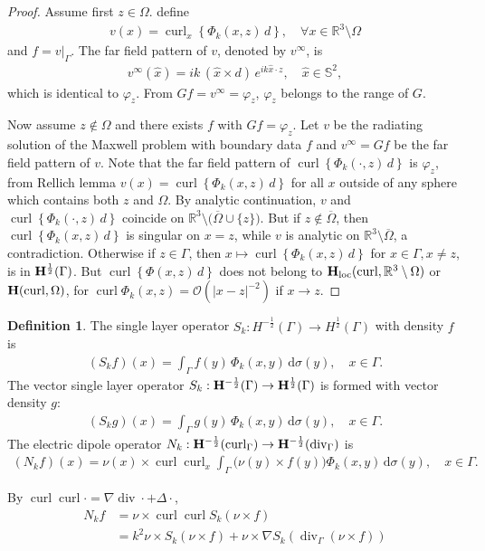 \documentclass[a4paper,12pt]{article}
\theoremstyle{definition}
\newtheorem{dfn}{Definition}
\newcommand\bdr{\Gamma}
\newcommand\Div{\divv_\bdr}
\newcommand\Curl{\curl_\bdr}
\newcommand\Hhp{{\bf H}^{\frac{1}{2}}}
\newcommand\Hhm{{\bf H}^{-\frac{1}{2}}}
\newcommand\Hhpg{\Hhp(\bdr)}
\newcommand\Hhmg{\Hhm(\bdr)}
\newcommand\lTD{\Hhm(\Div)}
\newcommand\lTC{\Hhm(\Curl)}
\newcommand\ints[2][y]{\int_{\bdr}#2\,\text{d}\sigma(#1)}
\DeclareMathOperator\curl{curl}
\DeclareMathOperator\divv{div}
\begin{document}
\begin{proof}
  Assume first $z\in\Omega$. define
  \begin{align*}
    v(x)=\curl_x\left\{\Phi_k(x, z)\,d\right\},\quad\forall x\in\mathbb{R}^3\setminus\Omega 
  \end{align*}
  and $f=v|_\bdr$. The far field pattern of $v$, denoted by $v^\infty$, is 
  \begin{align*}
    v^\infty(\hat{x}) = ik\,(\hat{x}\times d)\,e^{ik\hat{x}\cdot z},\quad\hat{x}\in\mathbb{S}^2,
  \end{align*}
  which is identical to $\varphi_z$. From $Gf=v^\infty=\varphi_z$, $\varphi_z$ belongs to the range of $G$.  
  
  Now assume $z\not\in\Omega$ and there exists $f$ with $Gf=\varphi_z$. Let $v$ be the radiating solution of the Maxwell problem with boundary data $f$ and $v^\infty=Gf$ be the far field pattern of $v$. Note that the far field pattern of $\curl\left\{\Phi_k(\cdot, z)\,d\right\}$ is $\varphi_z$, from Rellich lemma $v(x)=\curl\left\{\Phi_k(x, z)\,d\right\}$ for all $x$ outside of any sphere which contains both $z$ and $\Omega$. By analytic continuation, $v$ and $\curl\left\{\Phi_k(\cdot, z)\,d\right\}$ coincide on $\mathbb{R}^3\setminus\bigl(\overline{\Omega}\cup\{z\}\bigr)$. But if $z\not\in\overline{\Omega}$, then $\curl\left\{\Phi_k(x, z)\,d\right\}$ is singular on $x=z$, while $v$ is analytic on $\mathbb{R}^3\setminus\overline{\Omega}$, a contradiction. Otherwise if $z\in\bdr$, then $x\mapsto\curl\left\{\Phi_k(x, z)\,d\right\}$ for $x\in\bdr, x\neq z$, is in ${\bf H}^{\frac{1}{2}}(\bdr)$. But $\curl\left\{\Phi(x, z)\,d\right\}$ does not belong to ${\bf H}_\text{loc}(\curl, \mathbb{R}^3\setminus\Omega)$ or ${\bf H}(\curl, \Omega)$, for $\curl\Phi_k(x, z)=\mathcal{O}\left(|x-z|^{-2}\right)$ if $x\to z$.
\end{proof}

\begin{dfn}
  The single layer operator $S_k:H^{-\frac{1}{2}}(\bdr)\to H^{\frac{1}{2}}(\bdr)$ with density $f$ is
  \begin{align}
    (S_k f)(x) = \ints{f(y)\,\Phi_k(x,y)},\quad x\in\bdr.
  \end{align}
  The vector single layer operator $S_k:\Hhmg\to\Hhpg$ is formed with vector density $g$: 
  \begin{align}
    (S_k g)(x) = \ints{g(y)\,\Phi_k(x,y)},\quad x\in\bdr.
  \end{align}
  The electric dipole operator $N_k:\lTC\rightarrow\lTD$ is
  \begin{align}
    (N_k f)(x) = \nu(x)\times\curl\curl_x\ints{\big(\nu(y)\times f(y)\big)\Phi_k(x,y)},\quad x\in\bdr.
  \end{align}
\end{dfn}
By $\curl\curl\cdot=\nabla\divv\cdot + \Delta\cdot$, 
\begin{align}\label{eq:N}
  N_k f &= \nu\times\curl\curl S_k(\nu\times f)\nonumber \\ 
  &= k^2\nu\times S_k(\nu\times f) + \nu\times\nabla S_k(\Div(\nu\times f))
\end{align}
\end{document}
